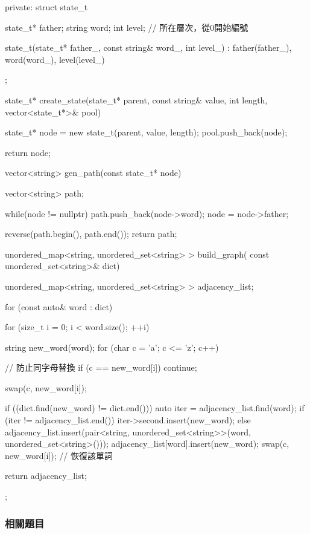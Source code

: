 \begin{Code}
{private:
    struct state_t {
        state_t* father;
        string word;
        int level; // 所在層次，從0開始編號

        state_t(state_t* father_, const string& word_, int level_) :
            father(father_), word(word_), level(level_) {}
    };

    state_t* create_state(state_t* parent, const string& value,
            int length, vector<state_t*>& pool) {
        state_t* node = new state_t(parent, value, length);
        pool.push_back(node);

        return node;
    }
    vector<string> gen_path(const state_t* node) {
        vector<string> path;

        while(node != nullptr) {
            path.push_back(node->word);
            node = node->father;
        }

        reverse(path.begin(), path.end());
        return path;
    }

    unordered_map<string, unordered_set<string> > build_graph(
            const unordered_set<string>& dict) {
        unordered_map<string, unordered_set<string> > adjacency_list;

        for (const auto& word : dict) {
            for (size_t i = 0; i < word.size(); ++i) {
                string new_word(word);
                for (char c = 'a'; c <= 'z'; c++) {
                    // 防止同字母替換
                    if (c == new_word[i]) continue;

                    swap(c, new_word[i]);

                    if ((dict.find(new_word) != dict.end())) {
                        auto iter = adjacency_list.find(word);
                        if (iter != adjacency_list.end()) {
                            iter->second.insert(new_word);
                        } else {
                            adjacency_list.insert(pair<string,
                                unordered_set<string>>(word, unordered_set<string>()));
                            adjacency_list[word].insert(new_word);
                        }
                    }
                    swap(c, new_word[i]); // 恢復該單詞
                }
            }
        }
        return adjacency_list;
    }
};
\end{Code}


\subsubsection{相關題目}

